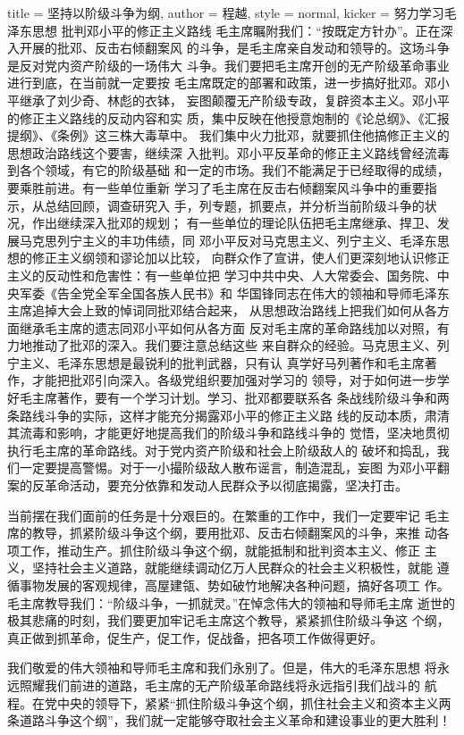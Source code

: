 \begin{hongqiarticle}{
        title  = {坚持以阶级斗争为纲},
        author = {程越},
        style  = normal,
        kicker = {努力学习毛泽东思想 批判邓小平的修正主义路线}
    }
    毛主席瞩附我们：“按既定方针办”。正在深入开展的批邓、反击右倾翻案风
    的斗争，是毛主席亲自发动和领导的。这场斗争是反对党内资产阶级的一场伟大
    斗争。我们要把毛主席开创的无产阶级革命事业进行到底，在当前就一定要按
    毛主席既定的部署和政策，进一步搞好批邓。邓小平继承了刘少奇、林彪的衣钵，
    妄图颠覆无产阶级专政，复辟资本主义。邓小平的修正主义路线的反动内容和实
    质，集中反映在他授意炮制的《论总纲》、《汇报提纲》、《条例》这三株大毒草中。
    我们集中火力批邓，就要抓住他搞修正主义的思想政治路线这个要害，继续深
    入批判。邓小平反革命的修正主义路线曾经流毒到各个领域，有它的阶级基础
    和一定的市场。我们不能满足于已经取得的成绩，要乘胜前进。有一些单位重新
    学习了毛主席在反击右倾翻案风斗争中的重要指示，从总结回顾，调查研究入
    手，列专题，抓要点，并分析当前阶级斗争的状况，作出继续深入批邓的规划；
    有一些单位的理论队伍把毛主席继承、捍卫、发展马克思列宁主义的丰功伟绩，同
    邓小平反对马克思主义、列宁主义、毛泽东思想的修正主义纲领和谬论加以比较，
    向群众作了宣讲，使人们更深刻地认识修正主义的反动性和危害性：有一些单位把
    学习中共中央、人大常委会、国务院、中央军委《告全党全军全国各族人民书》和
    华国锋同志在伟大的领袖和导师毛泽东主席追掉大会上致的悼词同批邓结合起来，
    从思想政治路线上把我们如何从各方面继承毛主席的遗志同邓小平如何从各方面
    反对毛主席的革命路线加以对照，有力地推动了批邓的深入。我们要注意总结这些
    来自群众的经验。马克思主义、列宁主义、毛泽东思想是最锐利的批判武器，只有认
    真学好马列著作和毛主席著作，才能把批邓引向深入。各级党组织要加强对学习的
    领导，对于如何进一步学好毛主席著作，要有一个学习计划。学习、批邓都要联系各
    条战线阶级斗争和两条路线斗争的实际，这样才能充分揭露邓小平的修正主义路
    线的反动本质，肃清其流毒和影响，才能更好地提高我们的阶级斗争和路线斗争的
    觉悟，坚决地贯彻执行毛主席的革命路线。对于党内资产阶级和社会上阶级敌人的
    破坏和捣乱，我们一定要提高警惕。对于一小撮阶级敌人散布谣言，制造混乱，妄图
    为邓小平翻案的反革命活动，要充分依靠和发动人民群众予以彻底揭露，坚决打击。

    当前摆在我们面前的任务是十分艰巨的。在繁重的工作中，我们一定要牢记
    毛主席的教导，抓紧阶级斗争这个纲，要用批邓、反击右倾翻案风的斗争，来推
    动各项工作，推动生产。抓住阶级斗争这个纲，就能抵制和批判资本主义、修正
    主义，坚持社会主义道路，就能继续调动亿万人民群众的社会主义积极性，就能
    遵循事物发展的客观规律，高屋建瓴、势如破竹地解决各种问题，搞好各项工
    作。毛主席教导我们：“阶级斗争，一抓就灵。”在悼念伟大的领袖和导师毛主席
    逝世的极其悲痛的时刻，我们要更加牢记毛主席这个教导，紧紧抓住阶级斗争这
    个纲，真正做到抓革命，促生产，促工作，促战备，把各项工作做得更好。

    我们敬爱的伟大领袖和导师毛主席和我们永别了。但是，伟大的毛泽东思想
    将永远照耀我们前进的道路，毛主席的无产阶级革命路线将永远指引我们战斗的
    航程。在党中央的领导下，紧紧“抓住阶级斗争这个纲，抓住社会主义和资本主义两
    条道路斗争这个纲”，我们就一定能够夺取社会主义革命和建设事业的更大胜利！
\end{hongqiarticle}
